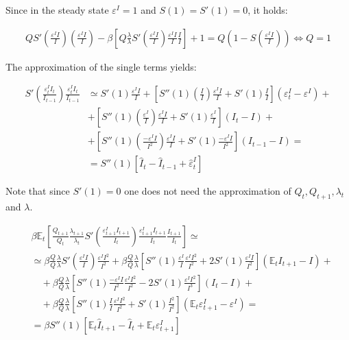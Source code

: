 \documentclass{pracamgr}
\numberwithin{equation}{section}
\begin{document}
Since in the steady state $\varepsilon^{I} = 1$ and $S(1) = S'(1) = 0$, it holds:

\begin{align}
QS' \left(\frac{\varepsilon^{I}I}{I} \right) \left( \frac{\varepsilon^{I}I}{I} \right) - \beta \left[ Q \frac{\lambda}{\lambda} S' \left(\frac{\varepsilon^{I}I}{I} \right) \frac{\varepsilon^{I}I}{I}  \frac{I}{I} \right] + 1 = Q \left( 1 - S \left(\frac{\varepsilon^{I}I}{I} \right) \right) \iff Q = 1
\end{align}

The approximation of the single terms yields:

\begin{align}
S' \left(\frac{\varepsilon_{t}^{I}I_{t}}{I_{t-1}} \right) \frac{\varepsilon_{t}^{I}I_{t}}{I_{t-1}} &\simeq S'(1) \frac{\varepsilon^{I}I}{I} + \left[ S''(1) \left(\frac{I}{I} \right) \frac{\varepsilon^{I}I}{I} + S'(1) \frac{I}{I} \right] \left( \varepsilon_{t}^{I} - \varepsilon^{I} \right) + \nonumber \\
&  + \left[ S''(1) \left(\frac{\varepsilon^{I}}{I} \right) \frac{\varepsilon^{I}I}{I} + S'(1) \frac{\varepsilon^{I}}{I} \right] \left( I_{t} - I \right) + \nonumber \\
& + \left[ S''(1) \left(\frac{-\varepsilon^{I}I}{I^{2}} \right) \frac{\varepsilon^{I}I}{I} + S'(1) \frac{-\varepsilon^{I}I}{I^{2}} \right] \left( I_{t-1}- I \right) = \nonumber \\
& = S''(1) \left[ \hat{I}_{t} - \hat{I}_{t-1} + \hat{\varepsilon}_{t}^{I} \right]
\end{align}

Note that since $S'(1) = 0$ one does not need the approximation of $Q_{t}, Q_{t+1}, \lambda_{t}$ and $\lambda$.

\begin{align}
&\beta \mathbb{E}_{t} \left[ \frac{Q_{t+1}}{Q_{t}} \frac{\lambda_{t+1}}{\lambda_{t}} S' \left(\frac{\varepsilon_{t+1}^{I}I_{t+1}}{I_{t}} \right) \frac{\varepsilon_{t+1}^{I}I_{t+1}}{I_{t}}  \frac{I_{t+1}}{I_{t}} \right] \simeq \nonumber \\
& \simeq \beta \frac{Q}{Q} \frac{\lambda}{\lambda} S' \left(\frac{\varepsilon^{I}I}{I} \right) \frac{\varepsilon^{I}I^{2}}{I^{2}} + \beta \frac{Q}{Q} \frac{\lambda}{\lambda} \left[ S''(1) \frac{\varepsilon^{I}}{I} \frac{\varepsilon^{I} I^{2}}{I^{2}} + 2S'(1) \frac{\varepsilon^{I} I}{I^{2}} \right] \left(\mathbb{E}_{t} I_{t+1} - I \right) + \nonumber \\
& \quad + \beta \frac{Q}{Q} \frac{\lambda}{\lambda} \left[ S''(1) \frac{-\varepsilon^{I}I}{I^{2}} \frac{\varepsilon^{I} I^{2}}{I^{2}} - 2S'(1) \frac{\varepsilon^{I} I^{2}}{I^{3}} \right] \left(I_{t} - I \right) + \nonumber \\
& \quad + \beta \frac{Q}{Q} \frac{\lambda}{\lambda} \left[ S''(1) \frac{I}{I} \frac{\varepsilon^{I} I^{2}}{I^{2}} + S'(1) \frac{I^{2}}{I^{2}} \right] \left(\mathbb{E}_{t} \varepsilon_{t+1}^{I} - \varepsilon^{I} \right) = \nonumber \\
& = \beta S''(1) \left[\mathbb{E}_{t} \hat{I}_{t+1} - \hat{I}_{t} + \mathbb{E}_{t} \varepsilon_{t+1}^{I} \right]
\end{align}
\end{document}
